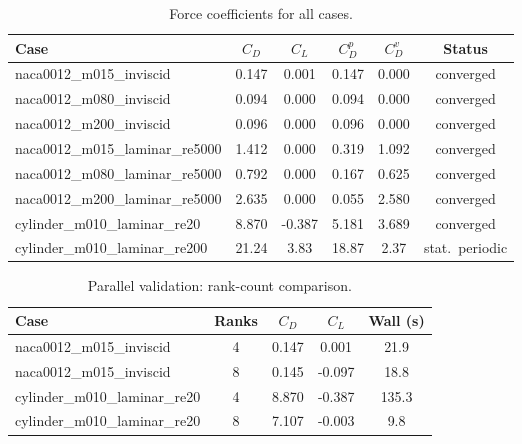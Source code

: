 \begin{table}[ht]
\centering
\caption{Force coefficients for all cases.}
\label{tab:forces}
\begin{tabular}{lccccc}
\toprule
Case & $C_D$ & $C_L$ & $C_D^p$ & $C_D^v$ & Status \\
\midrule
naca0012\_m015\_inviscid & 0.147 & 0.001 & 0.147 & 0.000 & converged \\
naca0012\_m080\_inviscid & 0.094 & 0.000 & 0.094 & 0.000 & converged \\
naca0012\_m200\_inviscid & 0.096 & 0.000 & 0.096 & 0.000 & converged \\
naca0012\_m015\_laminar\_re5000 & 1.412 & 0.000 & 0.319 & 1.092 & converged \\
naca0012\_m080\_laminar\_re5000 & 0.792 & 0.000 & 0.167 & 0.625 & converged \\
naca0012\_m200\_laminar\_re5000 & 2.635 & 0.000 & 0.055 & 2.580 & converged \\
cylinder\_m010\_laminar\_re20 & 8.870 & -0.387 & 5.181 & 3.689 & converged \\
cylinder\_m010\_laminar\_re200 & 21.24 & 3.83 & 18.87 & 2.37 & stat.~periodic \\
\bottomrule
\end{tabular}
\end{table}

\begin{table}[ht]
\centering
\caption{Parallel validation: rank-count comparison.}
\label{tab:parallel}
\begin{tabular}{lcccc}
\toprule
Case & Ranks & $C_D$ & $C_L$ & Wall (s) \\
\midrule
naca0012\_m015\_inviscid & 4 & 0.147 & 0.001 & 21.9 \\
naca0012\_m015\_inviscid & 8 & 0.145 & -0.097 & 18.8 \\
cylinder\_m010\_laminar\_re20 & 4 & 8.870 & -0.387 & 135.3 \\
cylinder\_m010\_laminar\_re20 & 8 & 7.107 & -0.003 & 9.8 \\
\bottomrule
\end{tabular}
\end{table}
